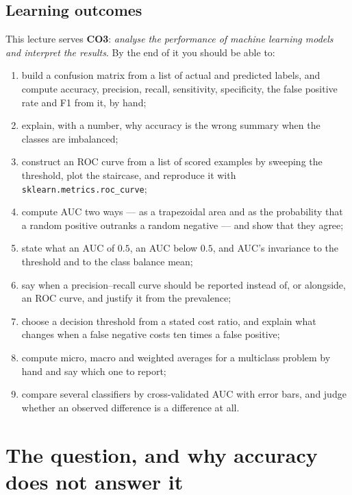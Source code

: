 \documentclass[11pt]{article}
\begin{document}
\subsection{Learning outcomes}

This lecture serves \textbf{CO3}: \emph{analyse the performance of machine
learning models and interpret the results}. By the end of it you should be able
to:

\begin{enumerate}[leftmargin=*]
  \item build a confusion matrix from a list of actual and predicted labels,
    and compute accuracy, precision, recall, sensitivity, specificity, the
    false positive rate and F1 from it, by hand;
  \item explain, with a number, why accuracy is the wrong summary when the
    classes are imbalanced;
  \item construct an ROC curve from a list of scored examples by sweeping the
    threshold, plot the staircase, and reproduce it with
    \texttt{sklearn.metrics.roc\_curve};
  \item compute AUC two ways --- as a trapezoidal area and as the probability
    that a random positive outranks a random negative --- and show that they
    agree;
  \item state what an AUC of $0.5$, an AUC below $0.5$, and AUC's invariance to
    the threshold and to the class balance mean;
  \item say when a precision--recall curve should be reported instead of, or
    alongside, an ROC curve, and justify it from the prevalence;
  \item choose a decision threshold from a stated cost ratio, and explain what
    changes when a false negative costs ten times a false positive;
  \item compute micro, macro and weighted averages for a multiclass problem by
    hand and say which one to report;
  \item compare several classifiers by cross-validated AUC with error bars, and
    judge whether an observed difference is a difference at all.
\end{enumerate}

\notesources{\AMLUnitVISources}

\section{The question, and why accuracy does not answer it}
\label{sec:whynot}
\end{document}

